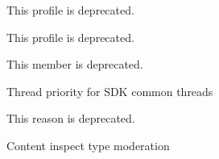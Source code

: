 \begin{DoxyRefList}
\label{deprecated__deprecated000007}%
%
This profile is deprecated. 

\label{deprecated__deprecated000008}%
%
This profile is deprecated. 

\label{deprecated__deprecated000009}%
%
This member is deprecated.  
\item[Member \mbox{\hyperlink{structagora_1_1base_1_1_agora_service_configuration_a2ea3127135604842eb40bd1c785d22a2}{agora\+::base\+::Agora\+Service\+Configuration\+::\+\_\+\+\_\+deprecated}} ]\label{deprecated__deprecated000001}%
%
Thread priority for S\+DK common threads  
\item[" ]\label{deprecated__deprecated000011}%
%
This reason is deprecated. 

\label{deprecated__deprecated000012}%
%
 Content inspect type moderation 


\end{DoxyRefList}

